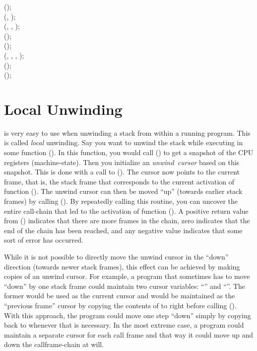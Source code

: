 \documentclass{article}
\begin{document}
\noindent
{}();\\
\noindent
{} (, );\\
\noindent
{} (, , );\\
\noindent
{} ();\\
 ();\\
\noindent
{} (, , , );\\

\noindent
{} ();\\
\noindent
{} ();\\

\section{Local Unwinding}

 is very easy to use when unwinding a stack from
within a running program.  This is called \emph{local} unwinding.  Say
you want to unwind the stack while executing in some function
().  In this function, you would call ()
to get a snapshot of the CPU registers (machine-state).  Then you
initialize an \emph{unwind~cursor} based on this snapshot.  This is
done with a call to ().  The cursor now points
to the current frame, that is, the stack frame that corresponds to the
current activation of function ().  The unwind cursor can then
be moved ``up'' (towards earlier stack frames) by calling
().  By repeatedly calling this routine, you can
uncover the entire call-chain that led to the activation of function
().  A positive return value from () indicates
that there are more frames in the chain, zero indicates that the end
of the chain has been reached, and any negative value indicates that
some sort of error has occurred.

While it is not possible to directly move the unwind cursor in the
``down'' direction (towards newer stack frames), this effect can be
achieved by making copies of an unwind cursor.  For example, a program
that sometimes has to move ``down'' by one stack frame could maintain
two cursor variables: ``'' and ``''.  The former
would be used as the current cursor and  would be maintained
as the ``previous frame'' cursor by copying the contents of 
to  right before calling ().  With this
approach, the program could move one step ``down'' simply by copying
back  to  whenever that is necessary.  In the most
extreme case, a program could maintain a separate cursor for each call
frame and that way it could move up and down the callframe-chain at
will.
\end{document}
